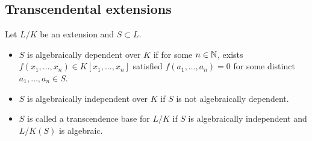\subsection{Transcendental extensions}

\begin{definition}
  Let $L/K$ be an extension and $S \subset L$.
  \begin{itemize}
    \item $S$ is algebraically dependent over $K$ if for some $n \in \mathbb{N}$,
      exists $f(x_1, \dots, x_n) \in K[x_1, \dots, x_n]$ satisfied
      $f(a_1, \dots, a_n) = 0$ for some distinct $a_1, \dots, a_n \in S$.
    \item $S$ is algebraically independent over $K$ if $S$ is not algebraically dependent.
    \item $S$ is called a transcendence base for $L/K$ if $S$ is algebraically independent
      and $L/K(S)$ is algebraic.
  \end{itemize}
\end{definition}

